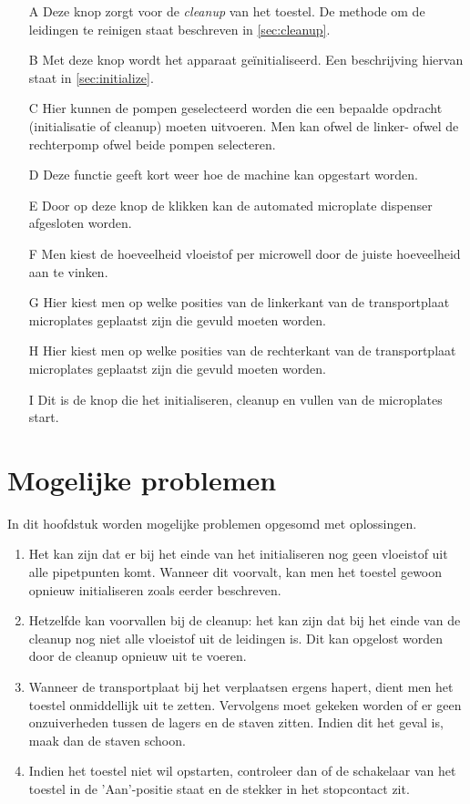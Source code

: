 \documentclass[a4paper,twoside,kulak]{kulakreport} %
\begin{document}
\begin{itemize}
	\item[A] Deze knop zorgt voor de \textit{cleanup} van het toestel. De methode om de leidingen te reinigen staat beschreven in \ref{sec:cleanup}.
	\item[B] Met deze knop wordt het apparaat geïnitialiseerd. Een beschrijving hiervan staat in \ref{sec:initialize}.
	\item[C] Hier kunnen de pompen geselecteerd worden die een bepaalde opdracht (initialisatie of cleanup) moeten uitvoeren. Men kan ofwel de linker- ofwel de rechterpomp ofwel beide pompen selecteren. 
	\item[D] Deze functie geeft kort weer hoe de machine kan opgestart worden.
	\item[E] Door op deze knop de klikken kan de automated microplate dispenser afgesloten worden.
	\item[F] Men kiest de hoeveelheid vloeistof per microwell door de juiste hoeveelheid aan te vinken.
	\item[G] Hier kiest men op welke posities van de linkerkant van de transportplaat microplates geplaatst zijn die gevuld moeten worden. 
	\item[H] Hier kiest men op welke posities van de rechterkant van de transportplaat microplates geplaatst zijn die gevuld moeten worden.
	\item[I] Dit is de knop die het initialiseren, cleanup en vullen van de microplates start.
\end{itemize}



\chapter*{Mogelijke problemen}
In dit hoofdstuk worden mogelijke problemen opgesomd met oplossingen.
\begin{enumerate}
	\item Het kan zijn dat er bij het einde van het initialiseren nog geen vloeistof uit alle pipetpunten komt. Wanneer dit voorvalt, kan men het toestel gewoon opnieuw initialiseren zoals eerder beschreven.
	\item Hetzelfde kan voorvallen bij de cleanup: het kan zijn dat bij het einde van de cleanup nog niet alle vloeistof uit de leidingen is. Dit kan opgelost worden door de cleanup opnieuw uit te voeren. 
	\item Wanneer de transportplaat bij het verplaatsen ergens hapert, dient men het toestel onmiddellijk uit te zetten. Vervolgens moet gekeken worden of er geen onzuiverheden tussen de lagers en de staven zitten. Indien dit het geval is, maak dan de staven schoon.
	\item Indien het toestel niet wil opstarten, controleer dan of de schakelaar van het toestel in de 'Aan'-positie staat en de stekker in het stopcontact zit. 

\end{enumerate}
\end{document}
